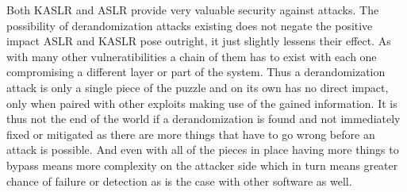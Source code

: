 Both KASLR and ASLR provide very valuable security against attacks.
The possibility of derandomization attacks existing does not negate the positive impact ASLR and KASLR pose outright, it just slightly lessens their effect.
As with many other vulneratibilities a chain of them has to exist with each one compromising a different layer or part of the system.
Thus a derandomization attack is only a single piece of the puzzle and on its own has no direct impact, only when paired with other exploits making use of the gained information.
It is thus not the end of the world if a derandomization is found and not immediately fixed or mitigated as there are more things that have to go wrong before an attack is possible.
And even with all of the pieces in place having more things to bypass means more complexity on the attacker side which in turn means greater chance of failure or detection as is the case with other software as well.
